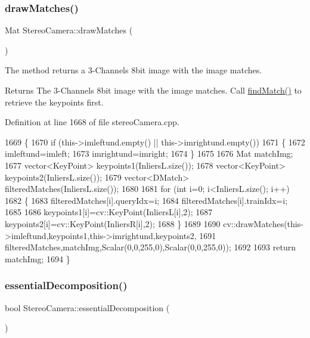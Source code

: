 \subsubsection{\texorpdfstring{draw\+Matches()}{drawMatches()}}
{\footnotesize\ttfamily Mat Stereo\+Camera\+::draw\+Matches (\begin{DoxyParamCaption}{ }\end{DoxyParamCaption})}



The method returns a 3-\/\+Channels 8bit image with the image matches. 

\begin{DoxyReturn}{Returns}
The 3-\/\+Channels 8bit image with the image matches. Call \hyperlink{classStereoCamera_aeb1cf4e41058cd70c7df6b8c2511548d}{find\+Match()} to retrieve the keypoints first. 
\end{DoxyReturn}


Definition at line 1668 of file stereo\+Camera.\+cpp.


\begin{DoxyCode}
1669 \{
1670     \textcolor{keywordflow}{if} (this->imleftund.empty() || this->imrightund.empty())
1671     \{
1672         imleftund=imleft;
1673         imrightund=imright;
1674     \}
1675 
1676     Mat matchImg;
1677     vector<KeyPoint> keypoints1(InliersL.size());
1678     vector<KeyPoint> keypoints2(InliersL.size());
1679     vector<DMatch> filteredMatches(InliersL.size());
1680 
1681     \textcolor{keywordflow}{for} (\textcolor{keywordtype}{int} i=0; i<InliersL.size(); i++)
1682     \{
1683         filteredMatches[i].queryIdx=i;
1684         filteredMatches[i].trainIdx=i;
1685 
1686         keypoints1[i]=cv::KeyPoint(InliersL[i],2);
1687         keypoints2[i]=cv::KeyPoint(InliersR[i],2);
1688     \}
1689 
1690     cv::drawMatches(this->imleftund,keypoints1,this->imrightund,keypoints2,
1691             filteredMatches,matchImg,Scalar(0,0,255,0),Scalar(0,0,255,0));
1692 
1693     \textcolor{keywordflow}{return} matchImg;
1694 \}
\end{DoxyCode}
\mbox{\label{classStereoCamera_a180388e93b654802c7c56c18d206214b}} 
\subsubsection{\texorpdfstring{essential\+Decomposition()}{essentialDecomposition()}}
{\footnotesize\ttfamily bool Stereo\+Camera\+::essential\+Decomposition (\begin{DoxyParamCaption}{ }\end{DoxyParamCaption})}



